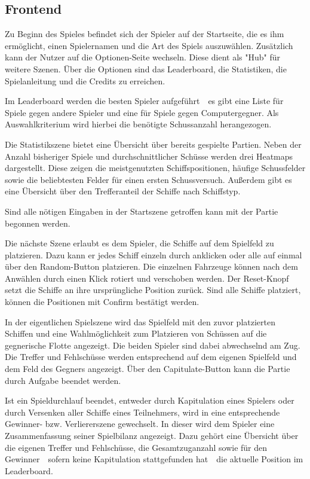 \documentclass[a4paper, 10pt, conference]{IEEEtran}
\begin{document}
\subsection{Frontend}\label{subsec:frontend}

Zu Beginn des Spieles befindet sich der Spieler auf der Startseite, die es ihm ermöglicht, einen Spielernamen und die Art des Spiels auszuwählen. Zusätzlich kann der Nutzer auf die Optionen-Seite wechseln. Diese dient als "Hub" für weitere Szenen. Über die Optionen sind das Leaderboard, die Statistiken, die Spielanleitung und die Credits zu erreichen. 

Im Leaderboard werden die besten Spieler aufgeführt~\textendash~es gibt eine Liste für Spiele gegen andere Spieler und eine für Spiele gegen Computergegner. Als Auswahlkriterium wird hierbei die benötigte Schussanzahl herangezogen.

Die Statistikszene bietet eine Übersicht über bereits gespielte Partien. Neben der Anzahl bisheriger Spiele und durchschnittlicher Schüsse werden drei Heatmaps dargestellt. Diese zeigen die meistgenutzten Schiffspositionen, häufige Schussfelder sowie die beliebtesten Felder für einen ersten Schussversuch. Außerdem gibt es eine Übersicht über den Trefferanteil der Schiffe nach Schiffstyp.

Sind alle nötigen Eingaben in der Startszene getroffen kann mit der Partie begonnen werden.

Die nächste Szene erlaubt es dem Spieler, die Schiffe auf dem Spielfeld zu platzieren. Dazu kann er jedes Schiff einzeln durch anklicken oder alle auf einmal über den Random-Button platzieren. Die einzelnen Fahrzeuge können nach dem Anwählen durch einen Klick rotiert und verschoben werden. Der Reset-Knopf setzt die Schiffe an ihre ursprüngliche Position zurück. Sind alle Schiffe platziert, können die Positionen mit Confirm bestätigt werden.

In der eigentlichen Spielszene wird das Spielfeld mit den zuvor platzierten Schiffen und eine Wahlmöglichkeit zum Platzieren von Schüssen auf die gegnerische Flotte angezeigt. Die beiden Spieler sind dabei abwechselnd am Zug. Die Treffer und Fehlschüsse werden entsprechend auf dem eigenen Spielfeld und dem Feld des Gegners angezeigt. Über den Capitulate-Button kann die Partie durch Aufgabe beendet werden. 

Ist ein Spieldurchlauf beendet, entweder durch Kapitulation eines Spielers oder durch Versenken aller Schiffe eines Teilnehmers, wird in eine entsprechende Gewinner- bzw. Verliererszene gewechselt. In dieser wird dem Spieler eine Zusammenfassung seiner Spielbilanz angezeigt. Dazu gehört eine Übersicht über die eigenen Treffer und Fehlschüsse, die Gesamtzuganzahl sowie für den Gewinner~\textendash~sofern keine Kapitulation stattgefunden hat~\textendash~die aktuelle Position im Leaderboard.
\end{document}
